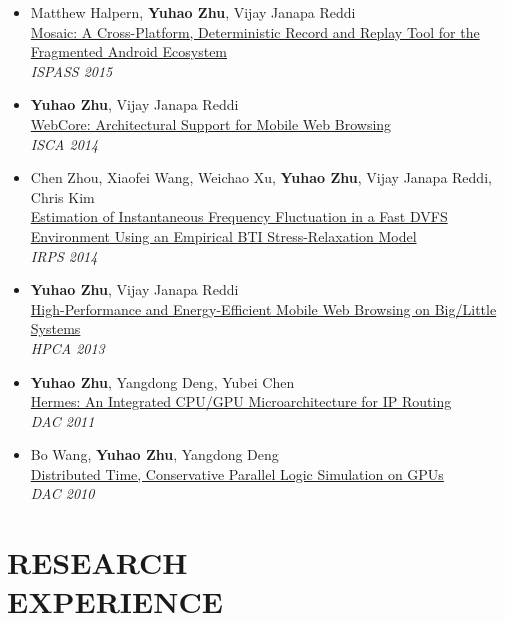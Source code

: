 \documentclass[margin, 9pt]{res} %
\begin{document}
\begin{resume}
\begin{itemize}[leftmargin=*]
	\item Matthew Halpern, \textbf{Yuhao Zhu}, Vijay Janapa Reddi\\
          \href{}{Mosaic: A Cross-Platform, Deterministic Record and Replay Tool for the Fragmented Android Ecosystem}\\
          \textit{ISPASS 2015}

	\item \textbf{Yuhao Zhu}, Vijay Janapa Reddi\\
          \href{http://yuhaozhu.com/pubs/isca14.pdf}{WebCore: Architectural Support for Mobile Web Browsing}\\
          \textit{ISCA 2014}

	\item Chen Zhou, Xiaofei Wang, Weichao Xu, \textbf{Yuhao Zhu}, Vijay Janapa Reddi, Chris Kim\\
          \href{http://yuhaozhu.com/pubs/irps14.pdf}{Estimation of Instantaneous Frequency Fluctuation in a Fast DVFS Environment Using an Empirical BTI Stress-Relaxation Model}\\
          \textit{IRPS 2014}

	\item \textbf{Yuhao Zhu}, Vijay Janapa Reddi\\
          \href{http://yuhaozhu.com/pubs/hpca13.pdf}{High-Performance and Energy-Efficient Mobile Web Browsing on Big/Little Systems}\\
          \textit{HPCA 2013}

	\item \textbf{Yuhao Zhu}, Yangdong Deng, Yubei Chen\\
          \href{http://yuhaozhu.com/pubs/dac11.pdf}{Hermes: An Integrated CPU/GPU Microarchitecture for IP Routing}\\
          \textit{DAC 2011}

	\item Bo Wang, \textbf{Yuhao Zhu}, Yangdong Deng\\
          \href{http://yuhaozhu.com/pubs/dac10.pdf}{Distributed Time, Conservative Parallel Logic Simulation on GPUs}\\
          \textit{DAC 2010}
\end{itemize}
 

\section{RESEARCH\\ EXPERIENCE}


\end{resume}
\end{document}
